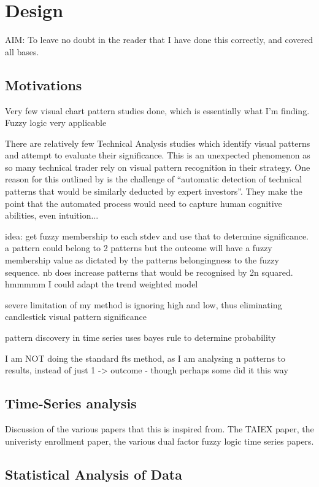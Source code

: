 \documentclass{article}
\theoremstyle{definition}
\begin{document}
\section{Design}

AIM: To leave no doubt in the reader that I have done this correctly, and covered all bases.

\subsection{Motivations}

Very few visual chart pattern studies done, which is essentially what I'm finding. Fuzzy logic very applicable

There are relatively few Technical Analysis studies which identify visual patterns and attempt to evaluate their significance. This is an unexpected phenomenon as so many technical trader rely on visual pattern recognition in their strategy. One reason for this outlined by \cite{2020} is the challenge of ``automatic detection of technical patterns that would be similarly deducted by expert investors''. They make the point that the automated process would need to capture human cognitive abilities, even intuition...

idea: get fuzzy membership to each stdev and use that to determine significance. a pattern could belong to 2 patterns but the outcome will have a fuzzy membership value as dictated by the patterns belongingness to the fuzzy sequence. nb does increase patterns that would be recognised by 2n squared.
hmmmmm I could adapt the trend weighted model

severe limitation of my method is ignoring high and low, thus eliminating candlestick visual pattern significance

pattern discovery in time series uses bayes rule to determine probability

I am NOT doing the standard fts method, as I am analysing n patterns to results, instead of just 1 -> outcome - though perhaps some did it this way

\subsection{Time-Series analysis}

Discussion of the various papers that this is inspired from. The TAIEX paper, the univeristy enrollment paper,  the various dual factor fuzzy logic time series papers.

\subsection{Statistical Analysis of Data}
\end{document}
